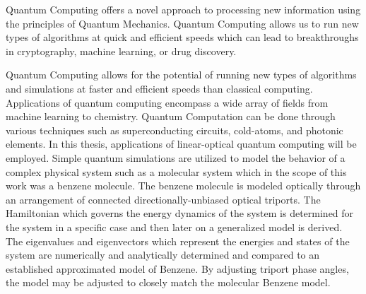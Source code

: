 
Quantum Computing offers a novel approach to processing new information using the principles of Quantum Mechanics. Quantum Computing allows us to run new types of algorithms at quick and efficient speeds which can lead to breakthroughs in cryptography, machine learning, or drug discovery. 

Quantum Computing allows for the potential of running new types of algorithms and simulations at faster and efficient speeds than classical computing. Applications of quantum computing encompass a wide array of fields from machine learning to chemistry. Quantum Computation can be done through various techniques such as superconducting circuits, cold-atoms, and photonic elements. In this thesis, applications of linear-optical quantum computing will be employed. Simple quantum simulations are utilized to model the behavior of a complex physical system such as a molecular system which in the scope of this work was a benzene molecule. The benzene molecule is modeled optically through an arrangement of connected directionally-unbiased optical triports. The Hamiltonian which governs the energy dynamics of the system is determined for the system in a specific case and then later on a generalized model is derived. The eigenvalues and eigenvectors which represent the energies and states of the system are numerically and analytically determined and compared to an established approximated model of Benzene. By adjusting triport phase angles, the model may be adjusted to closely match the molecular Benzene model.